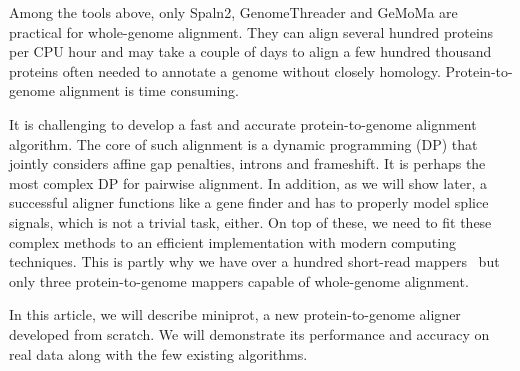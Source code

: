 \documentclass{bioinfo}
\begin{document}
Among the tools above, only Spaln2, GenomeThreader and GeMoMa are practical for
whole-genome alignment. They
can align several hundred proteins per CPU hour and may take a couple of days
to align a few hundred thousand proteins often needed to annotate a genome
without closely homology. Protein-to-genome alignment is time consuming.

It is challenging to develop a fast and accurate protein-to-genome alignment
algorithm. The core of such alignment is a dynamic programming (DP) that
jointly considers affine gap penalties, introns and frameshift. It is perhaps
the most complex DP for pairwise alignment. In addition, as we will show later,
a successful aligner functions like a gene finder and has to properly model
splice signals, which is not a trivial task, either. On top of these, we need
to fit these complex methods to an efficient implementation with modern
computing techniques. This is partly why we have over a hundred short-read
mappers~\citep{Alser:2021tk} but only three protein-to-genome mappers capable of
whole-genome alignment.

In this article, we will describe miniprot, a new protein-to-genome aligner
developed from scratch. We will demonstrate its performance and accuracy on
real data along with the few existing algorithms.
\end{document}
